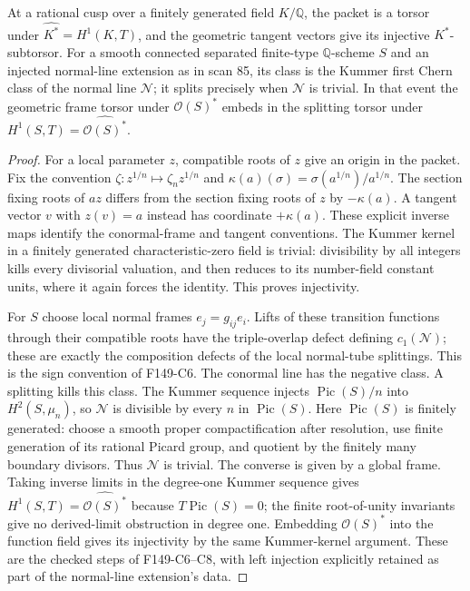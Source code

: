 \begin{proposition}
\label{F-torsors}
At a rational cusp over a finitely generated field $K/\mathbb Q$, the packet is a torsor
under $\widehat{K^*}=H^1(K,T)$, and the geometric tangent vectors
give its injective $K^*$-subtorsor. For a smooth connected separated
finite-type $\mathbb Q$-scheme $S$ and an injected normal-line
extension as in scan 85, its class is the Kummer first Chern class
of the normal line $\mathcal N$; it splits precisely when
$\mathcal N$ is trivial. In that event the geometric frame torsor
under $\mathcal O(S)^*$ embeds in the splitting torsor under
$H^1(S,T)=\widehat{\mathcal O(S)^*}$.
\end{proposition}
\begin{proof}
For a local parameter $z$, compatible roots of $z$ give an origin
in the packet. Fix the convention
$\zeta:z^{1/n}\mapsto\zeta_nz^{1/n}$ and
$\kappa(a)(\sigma)=\sigma(a^{1/n})/a^{1/n}$.
The section fixing roots of $az$ differs from the section fixing
roots of $z$ by $-\kappa(a)$. A tangent vector $v$ with
$z(v)=a$ instead has coordinate $+\kappa(a)$. These explicit
inverse maps identify the conormal-frame and tangent conventions.
The Kummer kernel in
a finitely generated characteristic-zero field is trivial:
divisibility by all integers kills every divisorial valuation,
and then reduces to its number-field constant units, where it
again forces the identity. This proves injectivity.

For $S$ choose local normal frames $e_j=g_{ij}e_i$. Lifts of these
transition functions through their compatible roots have the
triple-overlap defect defining $c_1(\mathcal N)$; these are exactly
the composition defects of the local normal-tube splittings.
This is the sign convention of F149-C6. The conormal line has
the negative class. A splitting kills this class. The Kummer
sequence injects $\operatorname{Pic}(S)/n$ into
$H^2(S,\mu_n)$, so $\mathcal N$ is divisible by every $n$ in
$\operatorname{Pic}(S)$. Here $\operatorname{Pic}(S)$ is finitely
generated: choose a smooth proper compactification after
resolution, use finite generation of its rational Picard group,
and quotient by the finitely many boundary divisors. Thus
$\mathcal N$ is trivial. The converse is given by a global frame.
Taking inverse limits in the degree-one Kummer sequence gives
$H^1(S,T)=\widehat{\mathcal O(S)^*}$ because
$T\operatorname{Pic}(S)=0$; the finite root-of-unity invariants
give no derived-limit obstruction in degree one. Embedding
$\mathcal O(S)^*$ into the function field gives its injectivity
by the same Kummer-kernel argument. These are the checked steps
of F149-C6--C8, with left injection explicitly retained as part
of the normal-line extension's data.
\end{proof}


